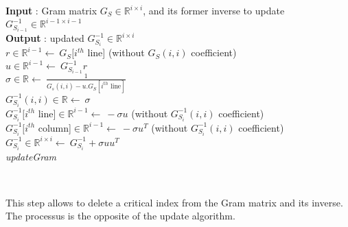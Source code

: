 \documentclass{ipol}
\newcommand{\RR}{\mathbb{R}}
\begin{document}
\begin{algorithm}[H]

\SetLine
\textbf{Input} : Gram matrix $G_S \in \mathbb{R}^{i \times i}$, and its former inverse to update $G_{S_{i-1}}^{-1}\in \mathbb{R}^{i-1 \times i-1}$\\
\textbf{Output} : updated  $G_{S_i}^{-1}\in \mathbb{R}^{i \times i}$\\
$r \in \mathbb{R}^{i-1} \leftarrow \  G_S[i^{th}$ line] (without $G_S(i,i)$ coefficient)\\
$u \in \mathbb{R}^{i-1} \leftarrow \ G_{S_{i-1}}^{-1} r$\\
$\sigma \in \mathbb{R} \leftarrow \ \frac{1}{G_s(i,i) - u.G_S[i^{th} \text{ line}]}$\\
$G_{S_i}^{-1}(i,i) \in \mathbb{R} \leftarrow \ \sigma$\\
$G_{S_i}^{-1}[i^{th}$ line]$\in \mathbb{R}^{i-1} \leftarrow \ -\sigma u$ (without $G_{S_i}^{-1}(i,i)$ coefficient)\\
$G_{S_i}^{-1}[i^{th}$ column]$\in \mathbb{R}^{i-1} \leftarrow \ -\sigma u^T$ (without $G_{S_i}^{-1}(i,i)$ coefficient)\\
\Return $G_{S_i}^{-1} \in \RR^{i \times i} \leftarrow \ G_{S_i}^{-1}+\sigma u u^T$\\
\caption{\textit{updateGram}}

\end{algorithm}\\

\newpage

\noindent This step allows to delete a critical index from the Gram matrix and its inverse. The processus is the opposite of the update algorithm.\\
\end{document}
